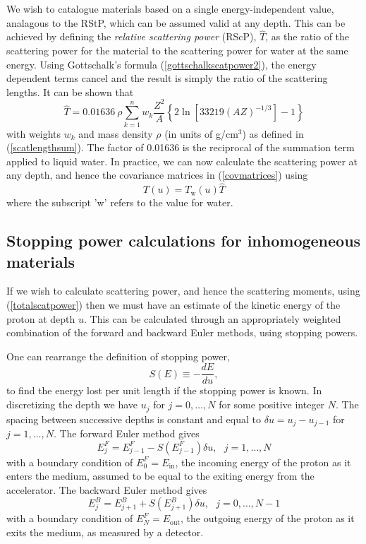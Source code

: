 \documentclass[preprint,times]{elsarticle}
\newcommand{\Eqn}[1]{(#1)} %
\begin{document}
We wish to catalogue materials based on a single energy-independent value, analagous to the RStP, which can be assumed valid at any depth. This can be achieved by defining the \emph{relative scattering power} (RScP), $\hat{T}$, as the ratio of the scattering power for the material to the scattering power for water at the same energy. Using Gottschalk's formula \Eqn{\ref{gottschalkscatpower2}}, the energy dependent terms cancel and the result is simply the ratio of the scattering lengths. It can be shown that
\begin{equation}
\hat{T} = 0.01636 \ \rho\sum_{k=1}^n w_k \frac{Z^2}{A}\left\{ 2\ln\left[ 33219(AZ)^{-1/3}\right]-1\right\} \label{relscatpower}
\end{equation}
with weights $w_k$ and mass density $\rho$ (in units of g/cm$^3$) as defined in (\ref{scatlengthsum}). The factor of 0.01636 is the reciprocal of the summation term applied to liquid water. In practice, we can now calculate the scattering power at any depth, and hence the covariance matrices in \Eqn{\ref{covmatrices}} using
\begin{equation}
T(u) = T_\mathrm{w}(u)\hat{T} \label{totalscatpower}
\end{equation}
where the subscript 'w' refers to the value for water.

\subsection{Stopping power calculations for inhomogeneous materials}\label{stoppingpowersection}

If we wish to calculate scattering power, and hence the scattering moments, using \Eqn{\ref{totalscatpower}} then we must have an estimate of the kinetic energy of the proton at depth $u$. This can be calculated through an appropriately weighted combination of the forward and backward Euler methods, using stopping powers. 

One can rearrange the definition of stopping power,
\begin{equation}
S(E) \equiv -\frac{dE}{du}, \label{stoppingpower}
\end{equation}
to find the energy lost per unit length if the stopping power is known. In discretizing the depth we have $u_j$ for $j=0,\dots,N$ for some positive integer $N$. The spacing between successive depths is constant and equal to $\delta u = u_j-u_{j-1}$ for $j=1,\dots,N$. The forward Euler method gives
\begin{equation}
E_j^F = E_{j-1}^F - S(E_{j-1}^F)\delta u, \ \ \ j=1,\dots,N \label{eulerforward}
\end{equation}
with a boundary condition of $E_0^F = E_\mathrm{in}$, the incoming energy of the proton as it enters the medium, assumed to be equal to the exiting energy from the accelerator. The backward Euler method gives
\begin{equation}
E_j^B = E_{j+1}^B + S(E_{j+1}^B)\delta u, \ \ \ j=0,\dots,N-1 \label{eulerbackward}
\end{equation}
with a boundary condition of $E_N^F = E_\mathrm{out}$, the outgoing energy of the proton as it exits the medium, as measured by a detector.
\end{document}
